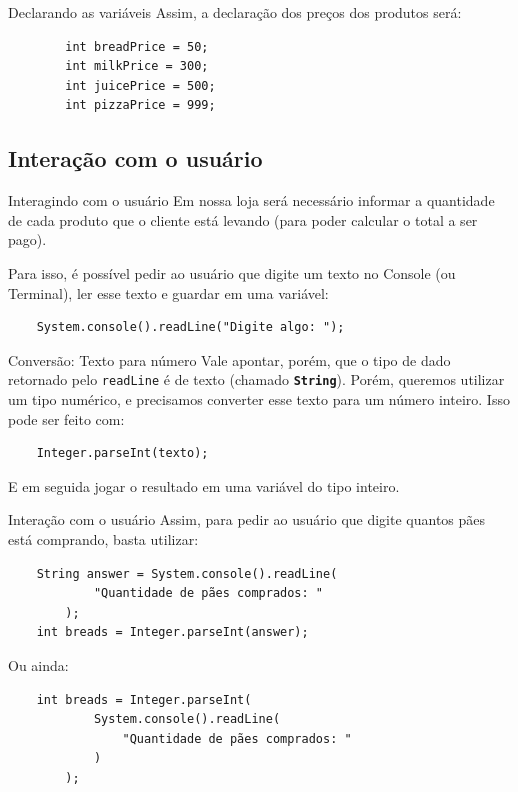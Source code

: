 \documentclass{beamer}
\begin{document}
\begin{frame}[fragile]{Declarando as variáveis}
    Assim, a declaração dos preços dos produtos será:

    \begin{verbatim}
        int breadPrice = 50;
        int milkPrice = 300;
        int juicePrice = 500;
        int pizzaPrice = 999;
    \end{verbatim}
\end{frame}


\subsection{Interação com o usuário}

\begin{frame}[fragile]{Interagindo com o usuário}
    Em nossa loja será necessário informar a quantidade de cada produto
    que o cliente está levando (para poder calcular o total a ser pago).

    Para isso, é possível pedir ao usuário que digite um texto no Console (ou
    Terminal), ler esse texto e guardar em uma variável:

    \begin{verbatim}
    System.console().readLine("Digite algo: ");
    \end{verbatim}
\end{frame}

\begin{frame}[fragile]{Conversão: Texto para número}
    Vale apontar, porém, que o tipo de dado retornado pelo \texttt{readLine} é
    de texto (chamado \textbf{\texttt{String}}).  Porém, queremos utilizar um
    tipo numérico, e precisamos converter esse texto para um número inteiro.
    Isso pode ser feito com:

    \begin{verbatim}
    Integer.parseInt(texto);
    \end{verbatim}
    E em seguida jogar o resultado em uma variável do tipo inteiro.
\end{frame}

\begin{frame}[fragile]{Interação com o usuário}
    Assim, para pedir ao usuário que digite quantos pães está comprando, basta utilizar:

    \begin{verbatim}
    String answer = System.console().readLine(
            "Quantidade de pães comprados: "
        );
    int breads = Integer.parseInt(answer);
    \end{verbatim}

    Ou ainda:

    \begin{verbatim}
    int breads = Integer.parseInt(
            System.console().readLine(
                "Quantidade de pães comprados: "
            )
        );
    \end{verbatim}
\end{frame}
\end{document}
